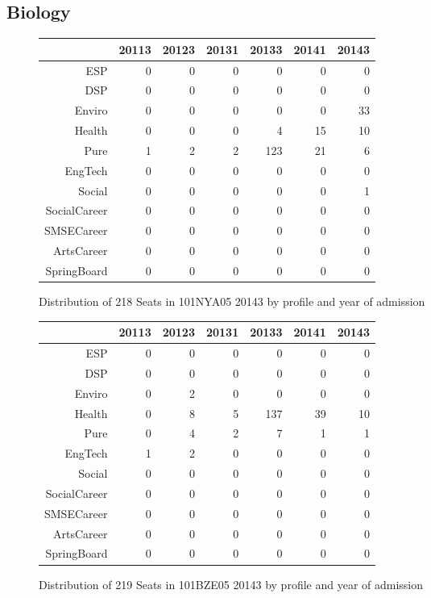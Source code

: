 \documentclass{article}\usepackage[]{graphicx}\usepackage[]{color}
\begin{document}
\subsection{Biology}
\begin{figure}[H]
\centering
\begin{tabular}{rrrrrrr}
  \hline
 & 20113 & 20123 & 20131 & 20133 & 20141 & 20143 \\ 
  \hline
ESP &   0 &   0 &   0 &   0 &   0 &   0 \\ 
  DSP &   0 &   0 &   0 &   0 &   0 &   0 \\ 
  Enviro &   0 &   0 &   0 &   0 &   0 &  33 \\ 
  Health &   0 &   0 &   0 &   4 &  15 &  10 \\ 
  Pure &   1 &   2 &   2 & 123 &  21 &   6 \\ 
  EngTech &   0 &   0 &   0 &   0 &   0 &   0 \\ 
  Social &   0 &   0 &   0 &   0 &   0 &   1 \\ 
  SocialCareer &   0 &   0 &   0 &   0 &   0 &   0 \\ 
  SMSECareer &   0 &   0 &   0 &   0 &   0 &   0 \\ 
  ArtsCareer &   0 &   0 &   0 &   0 &   0 &   0 \\ 
  SpringBoard &   0 &   0 &   0 &   0 &   0 &   0 \\ 
   \hline
\end{tabular}
\caption{Distribution of 218 Seats in 101NYA05 20143 by profile and year of admission} 
\end{figure}
\begin{figure}[H]
\centering
\begin{tabular}{rrrrrrr}
  \hline
 & 20113 & 20123 & 20131 & 20133 & 20141 & 20143 \\ 
  \hline
ESP &   0 &   0 &   0 &   0 &   0 &   0 \\ 
  DSP &   0 &   0 &   0 &   0 &   0 &   0 \\ 
  Enviro &   0 &   2 &   0 &   0 &   0 &   0 \\ 
  Health &   0 &   8 &   5 & 137 &  39 &  10 \\ 
  Pure &   0 &   4 &   2 &   7 &   1 &   1 \\ 
  EngTech &   1 &   2 &   0 &   0 &   0 &   0 \\ 
  Social &   0 &   0 &   0 &   0 &   0 &   0 \\ 
  SocialCareer &   0 &   0 &   0 &   0 &   0 &   0 \\ 
  SMSECareer &   0 &   0 &   0 &   0 &   0 &   0 \\ 
  ArtsCareer &   0 &   0 &   0 &   0 &   0 &   0 \\ 
  SpringBoard &   0 &   0 &   0 &   0 &   0 &   0 \\ 
   \hline
\end{tabular}
\caption{Distribution of 219 Seats in 101BZE05 20143 by profile and year of admission} 
\end{figure}
\end{document}
